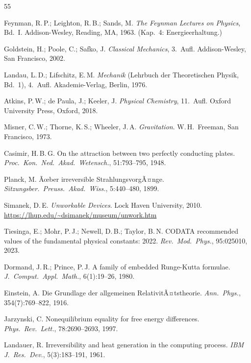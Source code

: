 ﻿\documentclass[12pt, a4paper]{report}
\theoremstyle{definition}
\theoremstyle{remark}
\begin{document}
\begin{thebibliography}{55}
\raggedright

  Feynman, R.\,P.; Leighton, R.\,B.; Sands, M.
  \textit{The Feynman Lectures on Physics}, Bd.~I.
  Addison-Wesley, Reading, MA, 1963.
  (Kap.~4: Energieerhaltung.)

  Goldstein, H.; Poole, C.; Safko, J.
  \textit{Classical Mechanics}, 3.~Aufl.
  Addison-Wesley, San Francisco, 2002.

  Landau, L.\,D.; Lifschitz, E.\,M.
  \textit{Mechanik} (Lehrbuch der Theoretischen Physik, Bd.~1), 4.~Aufl.
  Akademie-Verlag, Berlin, 1976.

  Atkins, P.\,W.; de Paula, J.; Keeler, J.
  \textit{Physical Chemistry}, 11.~Aufl.
  Oxford University Press, Oxford, 2018.

  Misner, C.\,W.; Thorne, K.\,S.; Wheeler, J.\,A.
  \textit{Gravitation}.
  W.\,H.\ Freeman, San Francisco, 1973.

  Casimir, H.\,B.\,G.
  On the attraction between two perfectly conducting plates.
  \textit{Proc.\ Kon.\ Ned.\ Akad.\ Wetensch.}, 51:793--795, 1948.

  Planck, M.
  Ãœber irreversible StrahlungsvorgÃ¤nge.
  \textit{Sitzungsber.\ Preuss.\ Akad.\ Wiss.}, 5:440--480, 1899.

  Simanek, D.\,E.
  \textit{Unworkable Devices}.
  Lock Haven University, 2010.
  {\small\url{https://lhup.edu/~dsimanek/museum/unwork.htm}}

  Tiesinga, E.; Mohr, P.\,J.; Newell, D.\,B.; Taylor, B.\,N.
  CODATA recommended values of the fundamental physical constants: 2022.
  \textit{Rev.\ Mod.\ Phys.}, 95:025010, 2023.

  Dormand, J.\,R.; Prince, P.\,J.
  A family of embedded Runge-Kutta formulae.
  \textit{J.\ Comput.\ Appl.\ Math.}, 6(1):19--26, 1980.

  Einstein, A.
  Die Grundlage der allgemeinen RelativitÃ¤tstheorie.
  \textit{Ann.\ Phys.}, 354(7):769--822, 1916.

  Jarzynski, C.
  Nonequilibrium equality for free energy differences.
  \textit{Phys.\ Rev.\ Lett.}, 78:2690--2693, 1997.

  Landauer, R.
  Irreversibility and heat generation in the computing process.
  \textit{IBM J.\ Res.\ Dev.}, 5(3):183--191, 1961.


\end{thebibliography}
\end{document}
